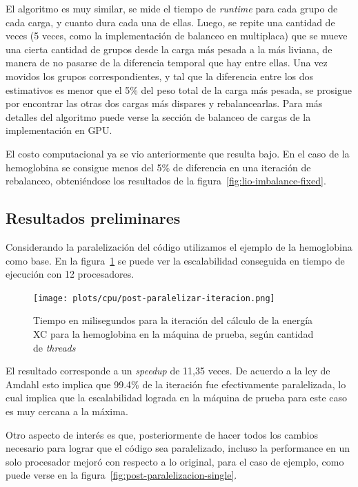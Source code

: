 El algoritmo es muy similar, se mide el tiempo de \textit{runtime} para cada
grupo de cada carga, y cuanto dura cada una de ellas. Luego, se repite una
cantidad de veces (5 veces, como la implementaci\'on de balanceo en multiplaca)
que se mueve una cierta cantidad de grupos desde la carga m\'as pesada a la
m\'as liviana, de manera de no pasarse de la diferencia temporal que hay entre
ellas. Una vez movidos los grupos correspondientes, y tal que la diferencia
entre los dos estimativos es menor que el 5\% del peso total de la carga m\'as
pesada, se prosigue por encontrar las otras dos cargas m\'as dispares y
rebalancearlas. Para m\'as detalles del algoritmo puede verse la secci\'on
de balanceo de cargas de la implementaci\'on en GPU.

El costo computacional ya se vio anteriormente que resulta bajo. En el caso
de la hemoglobina se consigue menos del 5\% de diferencia en una iteraci\'on
de rebalanceo, obteni\'endose los resultados de la figura~\ref{fig:lio-imbalance-fixed}.

\subsection{Resultados preliminares}

Considerando la paralelizaci\'on del c\'odigo utilizamos el ejemplo de la
hemoglobina como base. En la figura~\ref{fig:hemo-scale} se puede ver la
escalabilidad conseguida en tiempo de ejecuci\'on con 12 procesadores.

\begin{figure}[htbp]
   \centering
   \texttt{[image: plots/cpu/post-paralelizar-iteracion.png]}
   \caption{Tiempo en milisegundos para la iteraci\'on del c\'alculo de la energ\'ia
   XC para la hemoglobina en la m\'aquina de prueba, seg\'un cantidad de \textit{threads}}
   \label{fig:hemo-scale}
\end{figure}

El resultado corresponde a un \textit{speedup} de 11,35 veces. De acuerdo
a la ley de Amdahl esto implica que 99.4\% de la iteraci\'on fue efectivamente
paralelizada, lo cual implica que la escalabilidad lograda en la m\'aquina de
prueba para este caso es muy cercana a la m\'axima.

Otro aspecto de inter\'es es que, posteriormente de hacer todos los cambios
necesario para lograr que el c\'odigo sea paralelizado, incluso la performance
en un solo procesador mejor\'o con respecto a lo original, para el caso de ejemplo,
como puede verse en la figura~\ref{fig:post-paralelizacion-single}.

